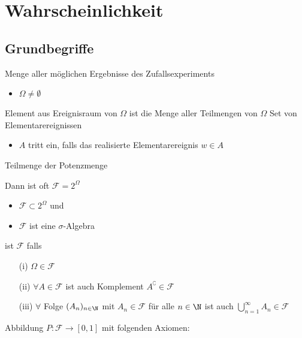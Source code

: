 
\section{Wahrscheinlichkeit}
\subsection{Grundbegriffe}
\begin{itemize}
     Menge aller möglichen Ergebnisse des Zufallsexperiments
        \begin{itemize}
            \item $\Omega \neq \emptyset$
        \end{itemize}
     Element aus Ereignisraum
     von $\Omega$ ist die Menge aller Teilmengen von $\Omega$
     Set von Elementarereignissen
        \begin{itemize}
            \item $A$ tritt ein, falls das realisierte Elementarereignis $w \in A$
        \end{itemize}
     Teilmenge der Potenzmenge
        \begin{itemize}
             Dann ist oft $\mathcal{F} = 2^\Omega$
                \begin{itemize}
                    \item $\mathcal{F} \subset 2^\Omega$ und
                    \item $\mathcal{F}$ ist eine $\sigma$-Algebra
                \end{itemize}
        \end{itemize}
     ist $\mathcal{F}$ falls
        \begin{itemize}
            \item[(i)] $\Omega \in \mathcal{F}$
            \item[(ii)] $\forall A \in \mathcal{F}$ ist auch Komplement $A^\complement \in \mathcal{F}$
            \item[(iii)] $\forall$ Folge $(A_n)_{n \in \N}$ mit $A_n \in \mathcal{F}$ für alle $n \in \N$ ist auch $\bigcup_{n=1}^\infty A_n \in \mathcal{F}$
        \end{itemize}
     Abbildung $P: \mathcal{F} \to [0,1]$ mit folgenden Axiomen:

\end{itemize}
